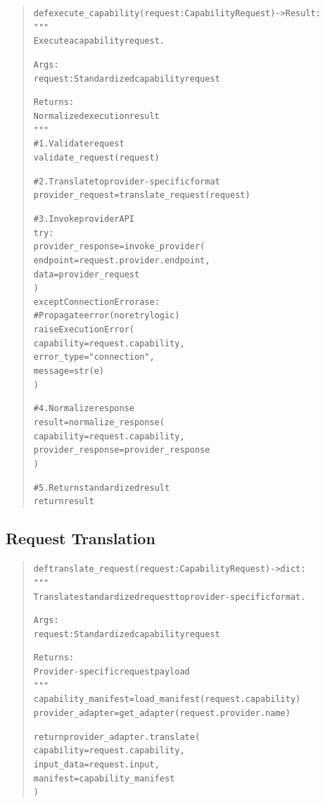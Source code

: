 \begin{quote}
\small
\begin{alltt}
def execute\_capability(request: CapabilityRequest) -> Result:
    """
    Execute a capability request.

    Args:
        request: Standardized capability request

    Returns:
        Normalized execution result
    """
    \# 1. Validate request
    validate\_request(request)

    \# 2. Translate to provider-specific format
    provider\_request = translate\_request(request)

    \# 3. Invoke provider API
    try:
        provider\_response = invoke\_provider(
            endpoint=request.provider.endpoint,
            data=provider\_request
        )
    except ConnectionError as e:
        \# Propagate error (no retry logic)
        raise ExecutionError(
            capability=request.capability,
            error\_type="connection",
            message=str(e)
        )

    \# 4. Normalize response
    result = normalize\_response(
        capability=request.capability,
        provider\_response=provider\_response
    )

    \# 5. Return standardized result
    return result
\end{alltt}
\end{quote}

\subsection{Request Translation}

\begin{quote}
\small
\begin{alltt}
def translate\_request(request: CapabilityRequest) -> dict:
    """
    Translate standardized request to provider-specific format.

    Args:
        request: Standardized capability request

    Returns:
        Provider-specific request payload
    """
    capability\_manifest = load\_manifest(request.capability)
    provider\_adapter = get\_adapter(request.provider.name)

    return provider\_adapter.translate(
        capability=request.capability,
        input\_data=request.input,
        manifest=capability\_manifest
    )
\end{alltt}
\end{quote}
